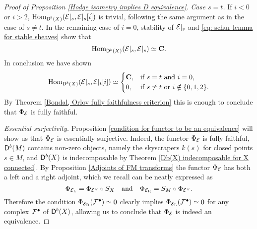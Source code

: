 \begin{proof}[Proof of Proposition \ref{Hodge isometry implies D equivalence}]
    \noindent
    \textsl{Case $s = t$.}
    If $i < 0$ or $i > 2$, $\mathrm{Hom}_{\mathsf{D}^b(X)}(\mathcal E|_s, \mathcal E|_s[i])$ is trivial, following the same argument as in the case of $s \neq t$. In the remaining case of $i = 0$, stability of $\mathcal E|_s$ and \eqref{eq: schur lemma for stable sheaves} show that 
    \[
        \mathrm{Hom}_{\mathsf{D}^b(X)}(\mathcal E|_s, \mathcal E|_s) \simeq \mathbf C.
    \]
    In conclusion we have shown
    \begin{equation}
            \mathrm{Hom}_{\mathsf{D}^b(X)}(\mathcal E|_s, \mathcal E|_t[i]) \simeq \begin{cases}
                \mathbf C, &\text{if $s = t$ and $i = 0$,} \\
                0, &\text{if $s \neq t$ or $i \notin \{0,1,2\}$.}
            \end{cases}
    \end{equation}
    By Theorem \ref{Bondal, Orlov fully faithfulness criterion} this is enough to conclude that $\Phi_{\mathcal E}$ is fully faithful. 

    

    \noindent
    \textsl{Essential surjectivity.} Proposition \ref{condition for functor to be an equivalence} will show us that $\Phi_{\mathcal E}$ is essentially surjective. Indeed, the functor $\Phi_{\mathcal E}$ is fully faithful, $\mathsf{D}^b(M)$ contains non-zero objects, namely the skyscrapers $k(s)$ for closed points $s \in M$, and $\mathsf{D}^b(X)$ is indecomposable by Theorem \ref{Db(X) indecomposable for X connected}. By Proposition \ref{Adjoints of FM transforms} the functor $\Phi_{\mathcal E}$ has both a left and a right adjoint, which we recall can be neatly expressed as
    \[
        \Phi_{\mathcal E_\mathrm{L}} = \Phi_{\mathcal E^\vee} \circ S_X \quad \text{and} \quad \Phi_{\mathcal E_\mathrm{R}} = S_M \circ \Phi_{\mathcal E^\vee}.
    \]
    Therefore the condition $\Phi_{\mathcal E_\mathrm{R}}(\mathcal F^\bullet) \simeq 0$ clearly implies $\Phi_{\mathcal E_\mathrm{L}}(\mathcal F^\bullet) \simeq 0$ for any complex $\mathcal F^\bullet$ of $\mathsf{D}^b(X)$, allowing us to conclude that $\Phi_{\mathcal E}$ is indeed an equivalence.


\end{proof}
